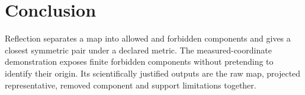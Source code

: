 \section{Conclusion}
Reflection separates a map into allowed and forbidden components and gives a
closest symmetric pair under a declared metric. The measured-coordinate
demonstration exposes finite forbidden components without pretending to identify
their origin. Its scientifically justified outputs are the raw map, projected
representative, removed component and support limitations together.

